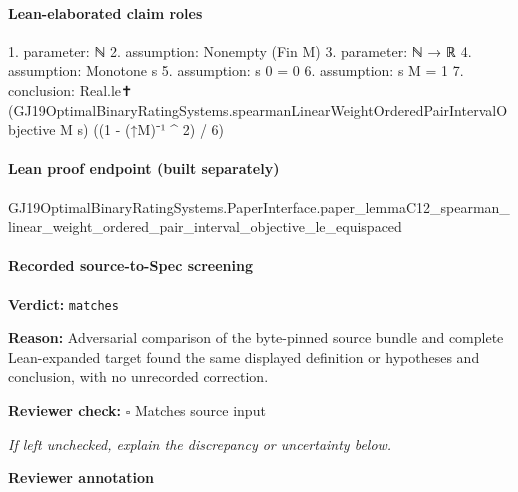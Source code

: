 \documentclass[10pt]{article}
\newcommand{\reviewerbox}{%
  \par\noindent\fbox{\parbox{0.96\linewidth}{\rule{0pt}{0.38in}}}\par
}
\newcommand{\reviewmatch}[1]{%
  \par\noindent\textbf{Reviewer check:} $\square$\; #1\par
  \noindent\emph{If left unchecked, explain the discrepancy or uncertainty below.}\par
}
\begin{document}
\paragraph{Lean-elaborated claim roles}\begin{ReviewVerbatim}
1. parameter: ℕ
2. assumption: Nonempty (Fin M)
3. parameter: ℕ → ℝ
4. assumption: Monotone s
5. assumption: s 0 = 0
6. assumption: s M = 1
7. conclusion: Real.le✝ (GJ19OptimalBinaryRatingSystems.spearmanLinearWeightOrderedPairIntervalObjective M s) ((1 - (↑M)⁻¹ ^ 2) / 6)
\end{ReviewVerbatim}

\paragraph{Lean proof endpoint (built separately)}\begin{ReviewVerbatim}
GJ19OptimalBinaryRatingSystems.PaperInterface.paper_lemmaC12_spearman_linear_weight_ordered_pair_interval_objective_le_equispaced
\end{ReviewVerbatim}

\paragraph{Recorded source-to-Spec screening}
\textbf{Verdict:} \texttt{matches}
\\
{\raggedright
\textbf{Reason:} Adversarial comparison of the byte-\allowbreak{}pinned source bundle and complete Lean-\allowbreak{}expanded target found the same displayed definition or hypotheses and conclusion, with no unrecorded correction.\allowbreak{}
\par}
\reviewmatch{Matches source input}
\noindent\textbf{Reviewer annotation}\par
\reviewerbox
\end{document}
